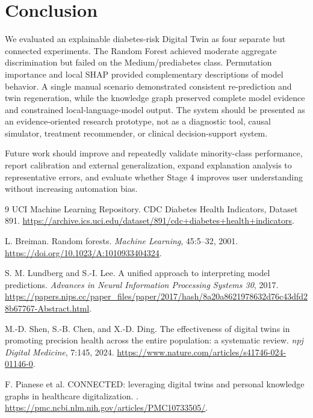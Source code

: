 \documentclass[11pt]{article}
\begin{document}
\section{Conclusion}

We evaluated an explainable diabetes-risk Digital Twin as four separate but connected experiments. The Random Forest achieved moderate aggregate discrimination but failed on the Medium/prediabetes class. Permutation importance and local SHAP provided complementary descriptions of model behavior. A single manual scenario demonstrated consistent re-prediction and twin regeneration, while the knowledge graph preserved complete model evidence and constrained local-language-model output. The system should be presented as an evidence-oriented research prototype, not as a diagnostic tool, causal simulator, treatment recommender, or clinical decision-support system.

Future work should improve and repeatedly validate minority-class performance, report calibration and external generalization, expand explanation analysis to representative errors, and evaluate whether Stage 4 improves user understanding without increasing automation bias.

\begin{thebibliography}{9}
UCI Machine Learning Repository.
\newblock CDC Diabetes Health Indicators, Dataset 891.
\newblock \url{https://archive.ics.uci.edu/dataset/891/cdc+diabetes+health+indicators}.

L. Breiman.
\newblock Random forests.
\newblock \emph{Machine Learning}, 45:5--32, 2001.
\newblock \url{https://doi.org/10.1023/A:1010933404324}.

S. M. Lundberg and S.-I. Lee.
\newblock A unified approach to interpreting model predictions.
\newblock \emph{Advances in Neural Information Processing Systems 30}, 2017.
\newblock \url{https://papers.nips.cc/paper_files/paper/2017/hash/8a20a8621978632d76c43dfd28b67767-Abstract.html}.

M.-D. Shen, S.-B. Chen, and X.-D. Ding.
\newblock The effectiveness of digital twins in promoting precision health across the entire population: a systematic review.
\newblock \emph{npj Digital Medicine}, 7:145, 2024.
\newblock \url{https://www.nature.com/articles/s41746-024-01146-0}.

F. Pianese et al.
\newblock CONNECTED: leveraging digital twins and personal knowledge graphs in healthcare digitalization.
.
\newblock \url{https://pmc.ncbi.nlm.nih.gov/articles/PMC10733505/}.
\end{thebibliography}
\end{document}
